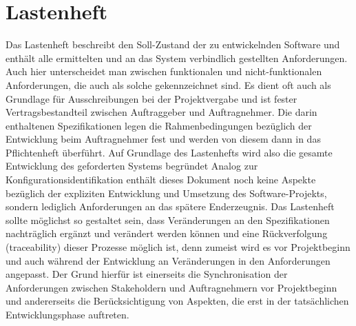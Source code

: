 \section{Lastenheft}
Das Lastenheft beschreibt den Soll-Zustand der zu entwickelnden Software und enthält alle ermittelten und an das System verbindlich gestellten Anforderungen. Auch hier unterscheidet man zwischen funktionalen und nicht-funktionalen Anforderungen, die auch als solche gekennzeichnet sind. 
Es dient oft auch als Grundlage für Ausschreibungen bei der Projektvergabe und ist fester Vertragsbestandteil zwischen Auftraggeber und Auftragnehmer. Die darin enthaltenen Spezifikationen legen die Rahmenbedingungen bezüglich der Entwicklung beim Auftragnehmer fest und werden von diesem dann in das Pflichtenheft überführt. Auf Grundlage des Lastenhefts wird also die gesamte Entwicklung des geforderten Systems begründet 
Analog zur Konfigurationsidentifikation enthält dieses Dokument noch keine Aspekte bezüglich der expliziten Entwicklung und Umsetzung des Software-Projekts, sondern lediglich Anforderungen an das spätere Enderzeugnis. 
Das Lastenheft sollte möglichst so gestaltet sein, dass Veränderungen an den Spezifikationen nachträglich ergänzt und verändert werden können und eine Rückverfolgung (traceability) dieser Prozesse möglich ist, denn zumeist wird es vor Projektbeginn und auch während der Entwicklung an Veränderungen in den Anforderungen angepasst. Der Grund hierfür ist einerseits die Synchronisation der Anforderungen zwischen Stakeholdern und Auftragnehmern vor Projektbeginn und andererseits die Berücksichtigung von Aspekten, die erst in der tatsächlichen Entwicklungsphase auftreten.
\cite{brd-lastenheft}

